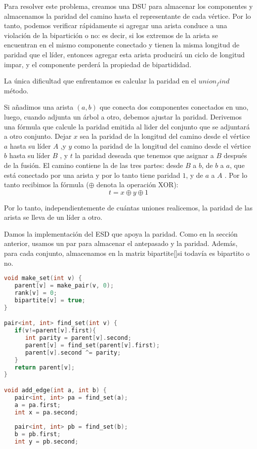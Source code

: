 \begin{itemize}
	 Para resolver este problema, creamos una DSU para almacenar los componentes y almacenamos la paridad del camino hasta el representante de cada vértice. Por lo tanto, podemos verificar rápidamente si agregar una arista conduce a una violación de la bipartición o no: es decir, si los extremos de la arista se encuentran en el mismo componente conectado y tienen la misma longitud de paridad que el líder, entonces agregar esta arista producirá un ciclo de longitud impar, y el componente perderá la propiedad de bipartididad.
	 
	 La única dificultad que enfrentamos es calcular la paridad en el $union_find$ método.
	 
	 Si añadimos una arista $(a,b)$ que conecta dos componentes conectados en uno, luego, cuando 
	 adjunta un árbol a otro, debemos ajustar la paridad. Derivemos una fórmula que calcule la
	 paridad emitida al lider del conjunto que se adjuntará a otro conjunto. Dejar $x$ sea la paridad de la longitud del camino desde el vértice $a$ hasta su líder $A$ ,y $y$ como la 
	 paridad de la longitud del camino desde el vértice $b$ hasta su líder $B$ , y $t$ la paridad 
	 deseada que tenemos que asignar a $B$ después de la fusión. El camino contiene la de las tres 
	 partes: desde $B$ a $b$, de $b$ a $a$, que está conectado por una arista y por lo tanto tiene 
	 paridad $1$, y de $a$ a $A$ . Por lo tanto recibimos la fórmula ($\oplus$ denota la operación XOR):
	 $$t = x \oplus y \oplus 1$$
	 
	 Por lo tanto, independientemente de cuántas uniones realicemos, la paridad de las arista se lleva de un líder a otro.
	 
	 Damos la implementación del ESD que apoya la paridad. Como en la sección anterior, usamos un par para almacenar el antepasado y la paridad. Además, para cada conjunto, almacenamos en la matriz bipartite[]si todavía es bipartito o no.
\begin{lstlisting}[language=C++]	 
void make_set(int v) {
   parent[v] = make_pair(v, 0);
   rank[v] = 0;
   bipartite[v] = true;
}

pair<int, int> find_set(int v) {
   if(v!=parent[v].first){
      int parity = parent[v].second;
      parent[v] = find_set(parent[v].first);
      parent[v].second ^= parity;
   }
   return parent[v];
}

void add_edge(int a, int b) {
   pair<int, int> pa = find_set(a);
   a = pa.first;
   int x = pa.second;
	
   pair<int, int> pb = find_set(b);
   b = pb.first;
   int y = pb.second;
	

\end{lstlisting}
\end{itemize}
